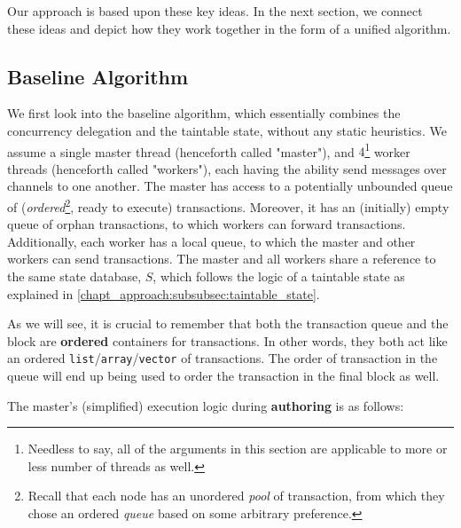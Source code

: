 Our approach is based upon these key ideas. In the next section, we connect these ideas and
depict how they work together in the form of a unified algorithm.

\subsection{Baseline Algorithm} \label{subsec:baseline_alg}

We first look into the baseline algorithm, which essentially combines the concurrency delegation and
the taintable state, without any static heuristics. We assume a single master thread (henceforth
called "master"), and $4$\footnote{Needless to say, all of the arguments in this section are
applicable to more or less number of threads as well.} worker threads (henceforth called "workers"),
each having the ability send messages over channels to one another. The master has access to a
potentially unbounded queue of (\textit{ordered}\footnote{Recall that each node has an unordered
\textit{pool} of transaction, from which they chose an ordered \textit{queue} based on some
arbitrary preference.}, ready to execute) transactions. Moreover, it has an (initially) empty queue
of orphan transactions, to which workers can forward transactions. Additionally, each worker has a
local queue, to which the master and other workers can send transactions. The master and all workers
share a reference to the same state database, $S$, which follows the logic of a taintable state as
explained in \ref{chapt_approach:subsubsec:taintable_state}.

\begin{remark}
	As we will see, it is crucial to remember that both the transaction queue and the block are
	\textbf{ordered} containers for transactions. In other words, they both act like an ordered
	\texttt{list}/\texttt{array}/\texttt{vector} of transactions. The order of transaction in the
	queue will end up being used to order the transaction in the final block as well.
\end{remark}

The master's (simplified) execution logic during \textbf{authoring} is as follows:

